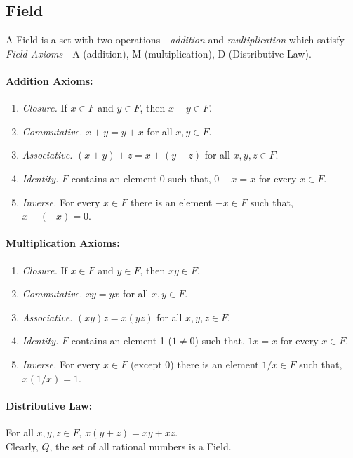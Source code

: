 \documentclass{article}
\begin{document}
 	\subsection{Field}
	A Field is a set with two operations - \emph{addition} and \emph{multiplication} which satisfy \emph{Field Axioms} - A (addition), M (multiplication),
	 D (Distributive Law).
	 \paragraph{Addition Axioms:}
	 \begin{enumerate}
	 	\item \emph{Closure.} If $x \in F$ and $y \in F$, then $x + y \in F$.
	 	\item \emph{Commutative.} $x + y = y + x$ for all $x,y \in F$.
	 	\item \emph{Associative.} $(x + y) + z = x + (y + z)$ for all $x,y,z \in F$.
	 	\item \emph{Identity.} $F$ contains an element 0 such that, $0 + x = x$ for every $x \in F$.
	 	\item \emph{Inverse.} For every $x \in F$ there is an element $-x \in F$ such that, $x + (-x) = 0$.
	 \end{enumerate}
 
	 \paragraph{Multiplication Axioms:}
	 \begin{enumerate}
	 	\item \emph{Closure.} If $x \in F$ and $y \in F$, then $xy \in F$.
	 	\item \emph{Commutative.} $xy = yx$ for all $x,y \in F$.
	 	\item \emph{Associative.} $(xy)z = x(yz)$ for all $x,y,z \in F$.
	 	\item \emph{Identity.} $F$ contains an element 1 ($1 \neq 0$) such that, $1x = x$ for every $x \in F$.
	 	\item \emph{Inverse.} For every $x \in F$ (except 0) there is an element $1/x \in F$ such that, $x(1/x) = 1$.
	 \end{enumerate}
	 
	 \paragraph{Distributive Law:} For all $x,y,z \in F$,  $x(y+z) = xy + xz$.\\
	 Clearly, $Q$, the set of all rational numbers is a Field.
	  
\end{document}

